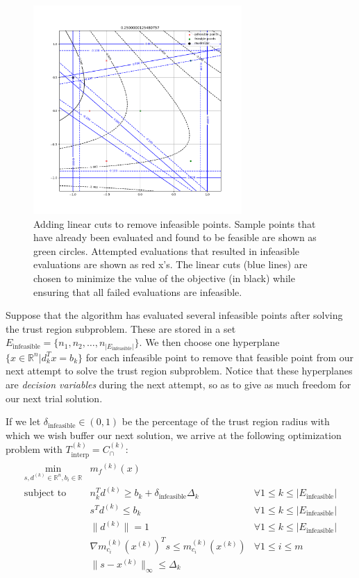 \documentclass{article}
\theoremstyle{case}
\numberwithin{theorem}{subsection}
\newcommand{\capcones}{{C^{(k)}_{\cap}}}
\newcommand{\dk}{\Delta_k}
\newcommand{\mcik}{{{m}^{(k)}_{c_i}}}
\newcommand{\mfk}{{{m}_f}^{(k)}}
\newcommand{\reals}{\mathbb R}
\newcommand{\Rn}{\mathbb R^n}
\newcommand{\sampletrk}{{T_{\text{interp}}^{(k)}}}
\newcommand{\trsinfset}{{E_\textrm{infeasible}}}
\newcommand{\trstol}{{\delta_\textrm{infeasible}}}
\newcommand{\xk}{{x^{(k)}}}
\begin{document}
\begin{figure}[h]
    \centering
    \includegraphics[width=300px]{images/pyomo_cut_solution.png}
    \caption{
		Adding linear cuts to remove infeasible points.
		Sample points that have already been evaluated and found to be feasible are shown as green circles.
		Attempted evaluations that resulted in infeasible evaluations are shown as red x's.
		The linear cuts (blue lines) are chosen to minimize the value of the objective (in black) while ensuring that all failed evaluations are infeasible.
	}
    \label{pvip}
\end{figure}


Suppose that the algorithm has evaluated several infeasible points after solving the trust region subproblem.
These are stored in a set $\trsinfset = \{n_1, n_2, \ldots, n_{|\trsinfset|}\}$.
We then choose one hyperplane $\{x \in \Rn | d_k^Tx = b_k\}$ for each infeasible point to remove that feasible point from our next attempt to solve the trust region subproblem.
Notice that these hyperplanes are \emph{decision variables} during the next attempt, so as to give as much freedom for our next trial solution.

If we let $\trstol \in (0, 1)$ be the percentage of the trust region radius with which we wish buffer our next solution, 
we arrive at the following optimization problem with $\sampletrk = \capcones$:
\begin{align}
\label{buffered_trust_region_subproblem}
\begin{array}{ccc}
\min_{s, d^{(k)} \in \Rn, b_i \in \reals}	& \mfk(x) & 	\\
 \mbox{subject to}  & n_k^Td^{(k)} \ge b_k + \trstol \dk& \forall 1 \le k \le |\trsinfset | \\
 & s^T d^{(k)} \le b_k &   \forall 1 \le k \le |\trsinfset |  \\
 & \|d^{(k)}\| = 1 & \forall 1 \le k \le |\trsinfset |	\\
 & \nabla \mcik(\xk) ^T s \le \mcik(\xk) & \forall 1 \le i \le m\\
 & \|s - \xk \|_{\infty} \le \dk & \\
\end{array}
\end{align}
\end{document}

